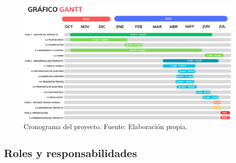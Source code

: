 \documentclass[a4paper, 11pt]{article}
\begin{document}
\clearpage
\begin{landscape}
\begin{figure}[H]
    \centering
    \includegraphics[width=24cm]{images/gant.png}
    \caption{Cronograma del proyecto. Fuente: Elaboración propia.}
    \label{fig:cronograma}
\end{figure}
\end{landscape}
\clearpage


\subsection{Roles y responsabilidades}
\par\vspace{0.5cm}
\end{document}
